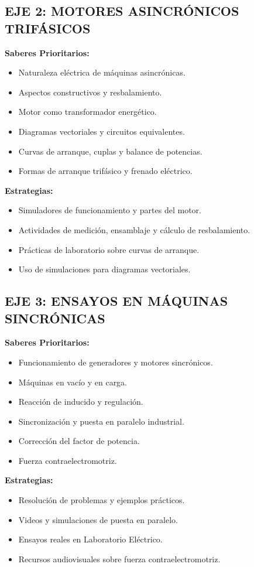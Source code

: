 \subsection*{EJE 2: MOTORES ASINCRÓNICOS TRIFÁSICOS}
\textbf{Saberes Prioritarios:}
\begin{itemize}
    \item Naturaleza eléctrica de máquinas asincrónicas.
    \item Aspectos constructivos y resbalamiento.
    \item Motor como transformador energético.
    \item Diagramas vectoriales y circuitos equivalentes.
    \item Curvas de arranque, cuplas y balance de potencias.
    \item Formas de arranque trifásico y frenado eléctrico.
\end{itemize}
\textbf{Estrategias:}
\begin{itemize}
    \item Simuladores de funcionamiento y partes del motor.
    \item Actividades de medición, ensamblaje y cálculo de resbalamiento.
    \item Prácticas de laboratorio sobre curvas de arranque.
    \item Uso de simulaciones para diagramas vectoriales.
\end{itemize}

\subsection*{EJE 3: ENSAYOS EN MÁQUINAS SINCRÓNICAS}
\textbf{Saberes Prioritarios:}
\begin{itemize}
    \item Funcionamiento de generadores y motores sincrónicos.
    \item Máquinas en vacío y en carga.
    \item Reacción de inducido y regulación.
    \item Sincronización y puesta en paralelo industrial.
    \item Corrección del factor de potencia.
    \item Fuerza contraelectromotriz.
\end{itemize}
\textbf{Estrategias:}
\begin{itemize}
    \item Resolución de problemas y ejemplos prácticos.
    \item Videos y simulaciones de puesta en paralelo.
    \item Ensayos reales en Laboratorio Eléctrico.
    \item Recursos audiovisuales sobre fuerza contraelectromotriz.
\end{itemize}